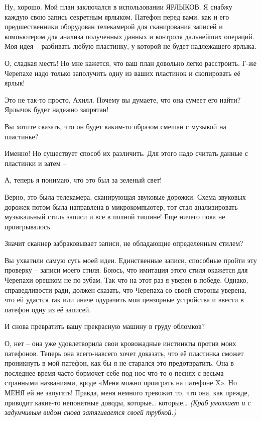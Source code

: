 \documentclass[../main.tex]{subfiles}
\begin{document}
\begin{dialogue}
 Ну, хорошо. Мой план заключался в использовании ЯРЛЫКОВ. Я снабжу каждую свою запись секретным ярлыком. Патефон перед вами, как и его предшественники оборудован телекамерой для сканирования записей и компьютером для анализа полученных данных и контроля дальнейших операций. Моя идея \--- разбивать любую пластинку, у которой не будет надлежащего ярлыка.

 О, сладкая месть! Но мне кажется, что ваш план довольно легко расстроить. Г-же Черепахе надо только заполучить одну из ваших пластинок и скопировать её ярлык!

 Это не так-то просто, Ахилл. Почему вы думаете, что она сумеет его найти? Ярлычок будет надежно запрятан!

 Вы хотите сказать, что он будет каким-то образом смешан с музыкой на пластинке?

 Именно! Но существует способ их различить. Для этого надо считать данные с пластинки и затем \---

 А, теперь я понимаю, что это был за зеленый свет!

 Верно, это была телекамера, сканирующая звуковые дорожки. Схема звуковых дорожек потом была направлена в микрокомпьютер, тот стал анализировать музыкальный стиль записи и все в полной тишине! Еще ничего пока не проигрывалось.

 Значит сканнер забраковывает записи, не обладающие определенным стилем?

 Вы ухватили самую суть моей идеи. Единственные записи, способные пройти эту проверку \--- записи моего стиля. Боюсь, что имитация этого стиля окажется для Черепахи орешком не по зубам. Так что на этот раз я уверен в победе. Однако, справедливости ради, должен сказать, что Черепаха со своей стороны уверена, что ей удастся так или иначе одурачить мои цензорные устройства и ввести в патефон одну из её записей.

 И снова превратить вашу прекрасную машину в груду обломков?

 О, нет \--- она уже удовлетворила свои кровожадные инстинкты против моих патефонов. Теперь она всего-навсего хочет доказать, что её пластинка сможет проникнуть в мой патефон, как бы я не старался это предотвратить. Она в последнее время часто бормочет себе под нос что-то о песнях с весьма странными названиями, вроде «Меня можно проиграть на патефоне X». Но МЕНЯ ей не запугать! Правда, меня немного тревожит то, что она, как прежде, приводит какие-то непонятные доводы, которые\ldots{} которые\ldots{} \emph{(Краб умолкает и с задумчивым видом снова затягивается своей трубкой.)}


\end{dialogue}
\end{document}
